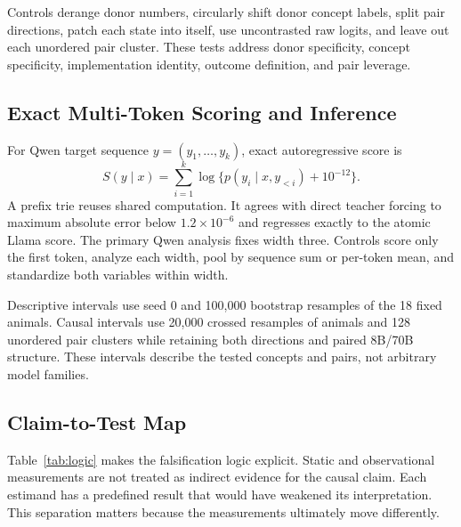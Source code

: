 \documentclass[letterpaper]{article}
\begin{document}
Controls derange donor numbers, circularly shift donor concept labels, split
pair directions, patch each state into itself, use uncontrasted raw logits, and
leave out each unordered pair cluster. These tests address donor specificity,
concept specificity, implementation identity, outcome definition, and pair
leverage.

\subsection{Exact Multi-Token Scoring and Inference}

For Qwen target sequence $y=(y_1,\ldots,y_k)$, exact autoregressive score is
\begin{equation}
S(y\mid x)=\sum_{i=1}^{k}\log\{p(y_i\mid x,y_{<i})+10^{-12}\}.
\end{equation}
A prefix trie reuses shared computation. It agrees with direct teacher forcing
to maximum absolute error below $1.2\times10^{-6}$ and regresses exactly to the
atomic Llama score. The primary Qwen analysis fixes width three. Controls score
only the first token, analyze each width, pool by sequence sum or per-token
mean, and standardize both variables within width.

Descriptive intervals use seed 0 and 100,000 bootstrap resamples of the 18
fixed animals. Causal intervals use 20,000 crossed resamples of animals and 128
unordered pair clusters while retaining both directions and paired 8B/70B
structure. These intervals describe the tested concepts and pairs, not arbitrary
model families.

\subsection{Claim-to-Test Map}

Table~\ref{tab:logic} makes the falsification logic explicit. Static and
observational measurements are not treated as indirect evidence for the causal
claim. Each estimand has a predefined result that would have weakened its
interpretation. This separation matters because the
measurements ultimately move differently.
\end{document}
